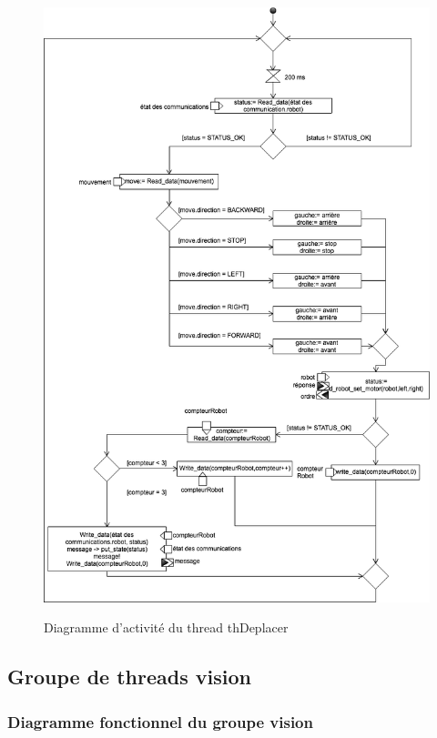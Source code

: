 \documentclass[11pt, a4paper]{paper}
\begin{document}
\begin{figure}[htbp]
\label{fig:act_communiquer}
\begin{center}
{\includegraphics[scale=.4]{./figures/deplacer}}
{\caption{Diagramme d'activité du thread thDeplacer}}
\end{center}
\end{figure}
\FloatBarrier


\subsection{Groupe de threads vision}

\subsubsection{Diagramme fonctionnel du groupe vision}
\end{document}
